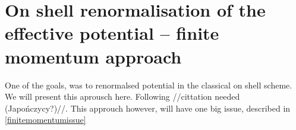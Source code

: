 \chapter{On shell renormalisation of the effective potential -- finite momentum approach}

One of the goals, was to renormalsed potential in the classical on shell scheme. 
We will present this aprousch here. Following //cittation needed (Japończycy?)//.
This approuch however, will have one big issue, described in \ref{finitemomentumissue}
